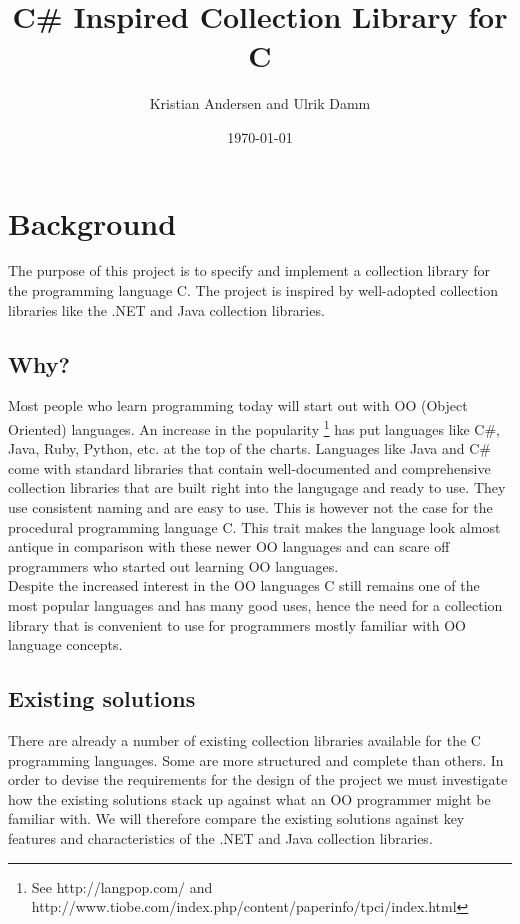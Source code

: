 \documentclass[11pt, letterpaper, twoside, openright]{book}
\title{C\#{} Inspired Collection Library for C}
\author{Kristian Andersen and Ulrik Damm}
\date{\today}
\begin{document}
\maketitle

\section{Background}\label{sec:background}
  The purpose of this project is to specify and implement a collection library for the programming language C. The project
  is inspired by well-adopted collection libraries like the .NET and Java collection libraries.
  
  \subsection{Why?}\label{sec:why}
    Most people who learn programming today will start out with OO (Object Oriented) languages. An increase in the popularity \footnote{See http://langpop.com/ and http://www.tiobe.com/index.php/content/paperinfo/tpci/index.html}  has put languages like C\#, Java, Ruby, Python, etc. at the top of the charts. Languages like Java and C\# come with standard libraries that contain well-documented and comprehensive collection libraries that are built right into the langugage and ready to use. They use consistent naming and are easy to use. This is however not the case for the procedural programming language C. This trait makes the language look almost antique in comparison with these newer OO languages and can scare off programmers who started out learning OO languages.\\

    Despite the increased interest in the OO languages C still remains one of the most popular languages and has many good uses, hence the need for a collection library that is convenient to use for programmers mostly familiar with OO language concepts.

  \subsection{Existing solutions}\label{sec:existing_solutions}
    There are already a number of existing collection libraries available for the C programming languages. Some are more structured and complete than others. In order to devise the requirements for the design of the project we must investigate how the existing solutions stack up against what an OO programmer might be familiar with. We will therefore compare the existing solutions against key features and characteristics of the .NET and Java collection libraries.\\
\end{document}
